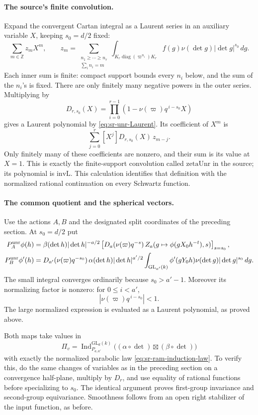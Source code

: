 \paragraph{The source's finite convolution.}
Expand the convergent Cartan integral as a Laurent series
in an auxiliary variable \(X\), keeping \(s_0=d/2\) fixed:
\[
 \sum_{m\in\mathbb Z}z_mX^m,\qquad
 z_m=\!\!\sum_{\substack{n_1\ge\cdots\ge n_r\\
                         \sum_i n_i=m}}\!
       \int_{K_r\operatorname{diag}(\varpi^{n_i})K_r}
           f(g)\nu(\det g)|\det g|^{s_0}\,dg.
\]
Each inner sum is finite: compact support bounds every
\(n_i\) below, and the sum of the \(n_i\)'s is fixed.
There are only finitely many negative powers in the outer
series.  Multiplying by
\[
 D_{r,s_0}(X)=
       \prod_{i=0}^{r-1}
          (1-\nu(\varpi)q^{\,i-s_0}X)
\]
gives a Laurent polynomial by
\eqref{eq:sr-unr-Laurent}.  Its coefficient of \(X^m\) is
\[
        \sum_{j=0}^r [X^j]D_{r,s_0}(X)\,z_{m-j}.
\]
Only finitely many of these coefficients are nonzero, and
their sum is its value at \(X=1\).  This is exactly the
finite-support convolution called \(\mathrm{zetaUnr}\)
in the source; its polynomial is \(\mathrm{invL}\).
This calculation identifies that definition with the
normalized rational continuation on every Schwartz function.

\paragraph{The common quotient and the spherical vectors.}
Use the actions \(A,B\) and the designated split coordinates
of the preceding section.  At \(s_0=d/2\) put
\begin{align}
 P_A^{\rm unr}\phi(h)
 &=\beta(\det h)|\det h|^{-a/2}
   \left[
     D_a(\nu(\varpi)q^{-s})\,
     Z_a(g\mapsto\phi(gX_0h^{-t}),s)
   \right]_{s=s_0},\label{eq:sr-unr-PA}\\
 P_B^{\rm unr}\phi'(h)
 &=D_{a'}(\nu(\varpi)q^{-s_0})\,
     \alpha(\det h)|\det h|^{a'/2}
       \int_{\mathrm{GL}_{a'}(k)}
       \phi'(gY_0h)\nu(\det g)|\det g|^{s_0}\,dg .
       \label{eq:sr-unr-PB}
\end{align}
The small integral converges ordinarily because
\(s_0>a'-1\).
Moreover its normalizing factor is nonzero:
for \(0\le i<a'\),
\[
             |\nu(\varpi)q^{\,i-s_0}|<1.
\]
The large normalized expression is evaluated as a Laurent
polynomial, as proved above.

Both maps take values in
\[
 \Pi_v=\operatorname{Ind}_{P_{a,a'}}^{\mathrm{GL}_d(k)}
          \bigl((\alpha\circ\det)\boxtimes(\beta\circ\det)\bigr)
\]
with exactly the normalized parabolic law
\eqref{eq:sr-ram-induction-law}.  To verify this, do the same
changes of variables as in the preceding section on a
convergence half-plane, multiply by \(D_r\), and use equality
of rational functions before specializing to \(s_0\).
The identical argument proves first-group invariance and
second-group equivariance.  Smoothness follows from an open
right stabilizer of the input function, as before.


